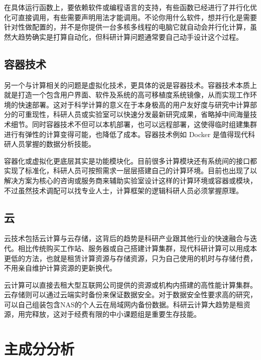 \documentclass[]{tufte-book}
\begin{document}
在具体运行函数上，要依赖软件或编程语言的支持，有些函数已经进行了并行化优化可直接调用，有些需要声明用法才能调用。不论你用什么软件，想并行化是需要针对性做配置的，并不是你提供一台多核多线程的电脑它就自动会并行化计算，虽然大趋势确实是打算自动化，但科研计算问题通常要自己动手设计这个过程。

\hypertarget{ux5bb9ux5668ux6280ux672f}{%
\subsection{容器技术}\label{ux5bb9ux5668ux6280ux672f}}

另一个与计算相关的问题是虚拟化技术，更具体的说是容器技术。容器技术本质上就是打造一个包含用户界面、软件及系统的高可移植度系统镜像，从而实现工作环境的快速部署。这对于科学计算的意义在于本身极高的用户友好度与研究中计算部分的可重现性，科研人员或实验室可以快速分发最新研究成果，省略掉中间海量技术细节。同时容器技术不但可以本机部署，也可以远程部署，这使得临时组建集群进行有弹性的计算变得可能，也降低了成本。容器技术例如 Docker 是值得现代科研人员掌握的数据分析技能。

容器化或虚拟化更底层其实是功能模块化。目前很多计算模块还有系统间的接口都实现了标准化，科研人员可按照需求一层层搭建自己的计算环境。目前也出现了以解决方案为核心的咨询或服务商来辅助实验室设计这样的计算环境或容器或模块，不过虽然技术调配可以找专业人士，计算框架的逻辑科研人员必须掌握原理。

\hypertarget{ux4e91}{%
\subsection{云}\label{ux4e91}}

云技术包括云计算与云存储，这背后的趋势是科研产业跟其他行业的快速融合与迭代。相比传统购买工作站、服务器或自己搭建计算集群，现代科研计算可以用成本更低的方法，也就是租赁计算资源与存储资源，只为自己使用的机时与存储付费，不用亲自维护计算资源的更新换代。

云计算可以直接去租大型互联网公司提供的资源或机构内搭建的高性能计算集群。云存储则可以通过云端实时备份来保证数据安全。对于数据安全性要求高的研究，可以自己组装包含NAS的个人云在局域网内备份数据。科研云计算大趋势是租资源，用完释放，这对于经费有限的中小课题组是重要生存技能。

\hypertarget{ux4e3bux6210ux5206ux5206ux6790}{%
\section{主成分分析}\label{ux4e3bux6210ux5206ux5206ux6790}}
\end{document}
